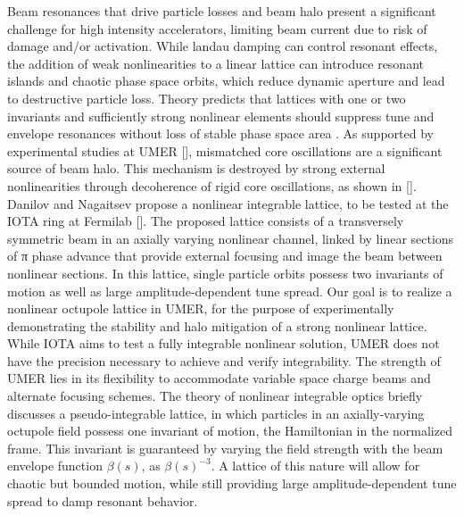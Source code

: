 Beam resonances that drive particle losses and beam halo present a significant challenge for high intensity accelerators, limiting beam current due to risk of damage and/or activation. While landau damping can control resonant effects, the addition of weak nonlinearities to a linear lattice can introduce resonant islands and chaotic phase space orbits, which reduce dynamic aperture and lead to destructive particle loss. Theory predicts that lattices with one or two invariants and sufficiently strong nonlinear elements should suppress tune and envelope resonances without loss of stable phase space area \cite{Danilov2010}. As supported by experimental studies at UMER [], mismatched core oscillations are a significant source of beam halo. This mechanism is destroyed by strong external nonlinearities through decoherence of rigid core oscillations, as shown in [].
Danilov and Nagaitsev \cite{Danilov2010} propose a nonlinear integrable lattice, to be tested at the IOTA ring at Fermilab []. The proposed lattice consists of a transversely symmetric beam in an axially varying nonlinear channel, linked by linear sections of π phase advance that provide external focusing and image the beam between nonlinear sections. In this lattice, single particle orbits possess two invariants of motion as well as large amplitude-dependent tune spread. 
Our goal is to realize a nonlinear octupole lattice in UMER, for the purpose of experimentally demonstrating the stability and halo mitigation of a strong nonlinear lattice. While IOTA aims to test a fully integrable nonlinear solution, UMER does not have the precision necessary to achieve and verify integrability. The strength of UMER lies in its flexibility to accommodate variable space charge beams and alternate focusing schemes. The theory of nonlinear integrable optics \cite{Danilov2010} briefly discusses a pseudo-integrable lattice, in which particles in an axially-varying octupole field possess one invariant of motion, the Hamiltonian in the normalized frame. This invariant is guaranteed by varying the field strength with the beam envelope function $\beta(s)$, as $\beta(s)^{-3}$. A lattice of this nature will allow for chaotic but bounded motion, while still providing large amplitude-dependent tune spread to damp resonant behavior.

